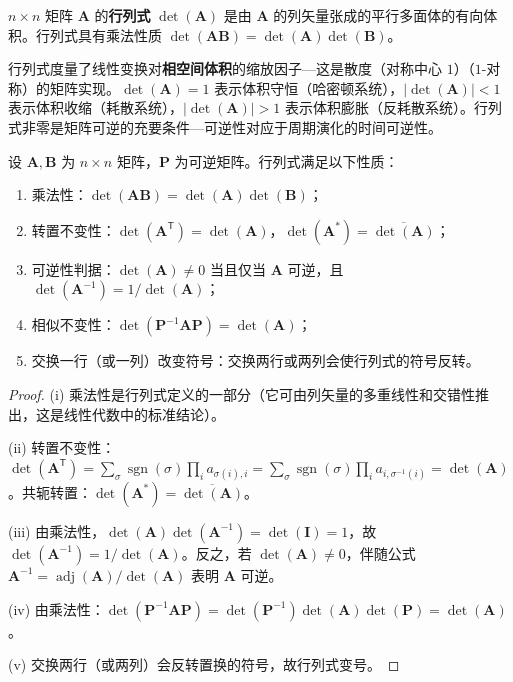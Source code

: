 \begin{definition}[行列式]\label{def:determinant}
$n \times n$ 矩阵 $\mathbf{A}$ 的\textbf{行列式} $\det(\mathbf{A})$ 是由 $\mathbf{A}$ 的列矢量张成的平行多面体的有向体积。行列式具有乘法性质 $\det(\mathbf{A}\mathbf{B}) = \det(\mathbf{A})\det(\mathbf{B})$。

行列式度量了线性变换对\textbf{相空间体积}的缩放因子---这是散度（对称中心 $1$）（$1$-对称）的矩阵实现。$\det(\mathbf{A}) = 1$ 表示体积守恒（哈密顿系统），$|\det(\mathbf{A})| < 1$ 表示体积收缩（耗散系统），$|\det(\mathbf{A})| > 1$ 表示体积膨胀（反耗散系统）。行列式非零是矩阵可逆的充要条件---可逆性对应于周期演化的时间可逆性。
\end{definition}

\begin{property}[行列式的运算性质]\label{ch5_determinant_properties}
设 $\mathbf{A}, \mathbf{B}$ 为 $n \times n$ 矩阵，$\mathbf{P}$ 为可逆矩阵。行列式满足以下性质：
\begin{enumerate}[label=(\roman*)]
    \item 乘法性：$\det(\mathbf{A}\mathbf{B}) = \det(\mathbf{A})\det(\mathbf{B})$；
    \item 转置不变性：$\det(\mathbf{A}^{\mathsf T}) = \det(\mathbf{A})$，$\det(\mathbf{A}^*) = \overline{\det(\mathbf{A})}$；
    \item 可逆性判据：$\det(\mathbf{A}) \neq 0$ 当且仅当 $\mathbf{A}$ 可逆，且 $\det(\mathbf{A}^{-1}) = 1/\det(\mathbf{A})$；
    \item 相似不变性：$\det(\mathbf{P}^{-1}\mathbf{A}\mathbf{P}) = \det(\mathbf{A})$；
    \item 交换一行（或一列）改变符号：交换两行或两列会使行列式的符号反转。
\end{enumerate}
\end{property}

\begin{proof}
(i) 乘法性是行列式定义的一部分（它可由列矢量的多重线性和交错性推出，这是线性代数中的标准结论）。

(ii) 转置不变性：$\det(\mathbf{A}^{\mathsf T}) = \sum_{\sigma} \operatorname{sgn}(\sigma) \prod_i a_{\sigma(i),i} = \sum_{\sigma} \operatorname{sgn}(\sigma) \prod_i a_{i,\sigma^{-1}(i)} = \det(\mathbf{A})$。共轭转置：$\det(\mathbf{A}^*) = \overline{\det(\mathbf{A})}$。

(iii) 由乘法性，$\det(\mathbf{A})\det(\mathbf{A}^{-1}) = \det(\mathbf{I}) = 1$，故 $\det(\mathbf{A}^{-1}) = 1/\det(\mathbf{A})$。反之，若 $\det(\mathbf{A}) \neq 0$，伴随公式 $\mathbf{A}^{-1} = \operatorname{adj}(\mathbf{A})/\det(\mathbf{A})$ 表明 $\mathbf{A}$ 可逆。

(iv) 由乘法性：$\det(\mathbf{P}^{-1}\mathbf{A}\mathbf{P}) = \det(\mathbf{P}^{-1})\det(\mathbf{A})\det(\mathbf{P}) = \det(\mathbf{A})$。

(v) 交换两行（或两列）会反转置换的符号，故行列式变号。
\end{proof}

